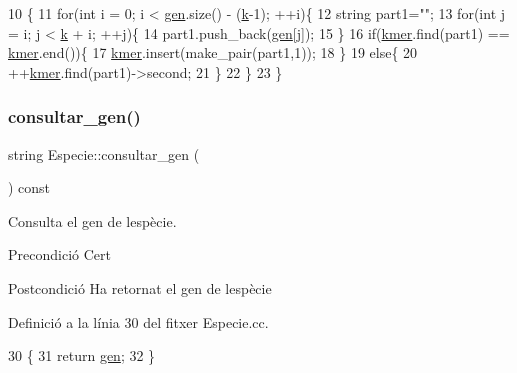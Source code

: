 \begin{DoxyCode}
10                            \{
11     \textcolor{keywordflow}{for}(\textcolor{keywordtype}{int} i = 0; i < \hyperlink{class_especie_ac35bb565f7346cd6317b3a8c849456d1}{gen}.size() - (\hyperlink{class_especie_a592c0ddeeebc786969f3040fbefea9df}{k}-1); ++i)\{
12         \textcolor{keywordtype}{string} part1=\textcolor{stringliteral}{""};
13         \textcolor{keywordflow}{for}(\textcolor{keywordtype}{int} j = i; j < \hyperlink{class_especie_a592c0ddeeebc786969f3040fbefea9df}{k} + i; ++j)\{
14             part1.push\_back(\hyperlink{class_especie_ac35bb565f7346cd6317b3a8c849456d1}{gen}[j]);
15         \}
16         \textcolor{keywordflow}{if}(\hyperlink{class_especie_ab6740db160f2d7335a98fa8d9f745cbe}{kmer}.find(part1) == \hyperlink{class_especie_ab6740db160f2d7335a98fa8d9f745cbe}{kmer}.end())\{
17             \hyperlink{class_especie_ab6740db160f2d7335a98fa8d9f745cbe}{kmer}.insert(make\_pair(part1,1));
18         \}
19         \textcolor{keywordflow}{else}\{
20             ++\hyperlink{class_especie_ab6740db160f2d7335a98fa8d9f745cbe}{kmer}.find(part1)->second;
21         \}
22     \}
23 \}
\end{DoxyCode}
\mbox{\label{class_especie_a850af2b59a21e2d801c59d76ba5c1a98}} 
\subsubsection{\texorpdfstring{consultar\+\_\+gen()}{consultar\_gen()}}
{\footnotesize\ttfamily string Especie\+::consultar\+\_\+gen (\begin{DoxyParamCaption}{ }\end{DoxyParamCaption}) const}



Consulta el gen de l\textquotesingle{}espècie. 

\begin{DoxyPrecond}{Precondició}
Cert 
\end{DoxyPrecond}
\begin{DoxyPostcond}{Postcondició}
Ha retornat el gen de l\textquotesingle{}espècie 
\end{DoxyPostcond}


Definició a la línia 30 del fitxer Especie.\+cc.


\begin{DoxyCode}
30                                    \{
31     \textcolor{keywordflow}{return} \hyperlink{class_especie_ac35bb565f7346cd6317b3a8c849456d1}{gen};
32 \}
\end{DoxyCode}
\mbox{\label{class_especie_ae72023f716c9ae50a160f751b0365efe}} 
